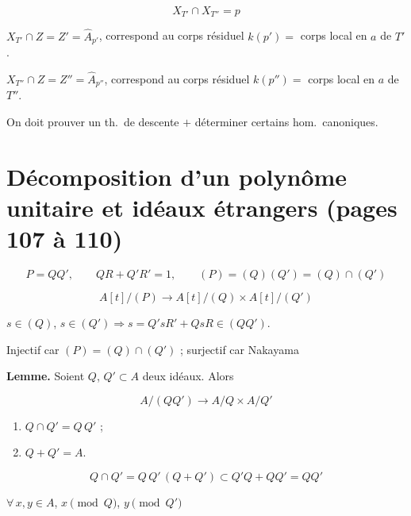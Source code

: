 \documentclass[11pt,a4paper]{article}
\begin{document}
\[ X_{T'} \cap X_{T''} = p \]

$X_{T'} \cap Z = Z' = \hat{A}_{p'}$, \quad correspond au corps résiduel $k(p')
= $ corps local en $a$ de $T'$.

$X_{T''} \cap Z = Z'' = \hat{A}_{p''}$, \quad correspond au corps résiduel
$k(p'') = $ corps local en $a$ de $T''$.


On doit prouver un th.\ de descente  $+$ déterminer certains hom.\ canoniques.

\section*{Décomposition d'un polynôme unitaire et idéaux étrangers (pages 107 à 110)}


\[ P = QQ', \qquad QR + Q'R' = 1, \qquad (P) = (Q)(Q') = (Q) \cap (Q') \]

\[ A[t]/(P) \longrightarrow A[t]/(Q) \times A[t]/(Q') \]

$s \in (Q)$, $s \in (Q') \Rightarrow s = Q'sR' + QsR \in (QQ')$.

Injectif car $(P) = (Q) \cap (Q')$ ; surjectif car \ill{} Nakayama \ill{}

\textbf{Lemme.} Soient $Q$, $Q' \subset A$ \struck{\ill{}} deux idéaux. Alors

\[ A/(QQ') \longrightarrow A/Q \times A/Q' \]

 \ill{}

\begin{enumerate}
\item[(i)] $Q \cap Q' = Q\,Q'$ ;
\item[(ii)] $Q + Q' = A$.
\end{enumerate}

\[ Q \cap Q' = Q\,Q'\,(Q + Q') \subset Q'Q + QQ' = QQ' \]

\ill{} $\forall\, x, y \in A$, \ill{} $x \pmod{Q}$, $y \pmod{Q'}$ \ill{}
\end{document}
